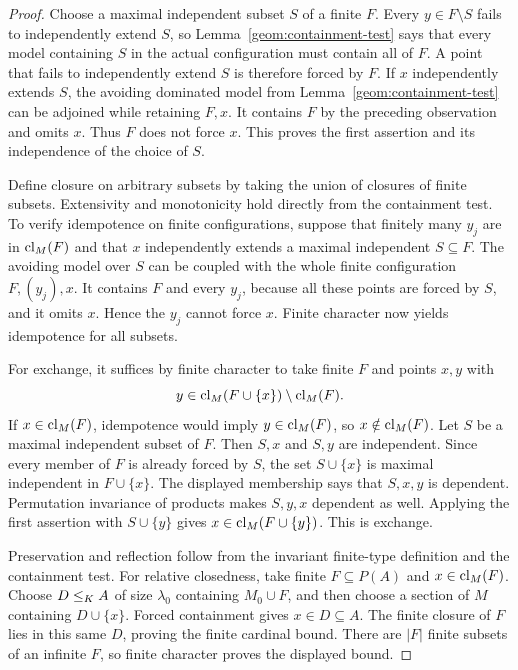 \begin{proof}
Choose a maximal independent subset $S$ of a finite $F$.  Every
$y\in F\setminus S$ fails to independently extend $S$, so
Lemma~\ref{geom:containment-test} says that every model containing $S$
in the actual configuration must contain all of $F$.  A point that
fails to independently extend $S$ is therefore forced by $F$.
If $x$ independently extends $S$, the avoiding dominated model from
Lemma~\ref{geom:containment-test} can be adjoined while retaining
$F,x$.  It contains $F$ by the preceding observation and omits $x$.
Thus $F$ does not force $x$.  This proves the first assertion and its
independence of the choice of $S$.

Define closure on arbitrary subsets by taking the union of closures
of finite subsets.  Extensivity and monotonicity hold directly from
the containment test.  To verify idempotence on finite configurations,
suppose that finitely many $y_j$ are in $\operatorname{cl}_M(F)$ and that $x$
independently extends a maximal independent $S\subseteq F$.  The
avoiding model over $S$ can be coupled with the whole finite
configuration $F,(y_j),x$.  It contains $F$ and every $y_j$, because
all these points are forced by $S$, and it omits $x$.  Hence the
$y_j$ cannot force $x$.  Finite character now yields idempotence for
all subsets.

For exchange, it suffices by finite character to take finite $F$ and
points $x,y$ with
\[
y\in\operatorname{cl}_M(F\cup\{x\})\setminus\operatorname{cl}_M(F).
\]
If $x\in\operatorname{cl}_M(F)$, idempotence would imply $y\in\operatorname{cl}_M(F)$, so
$x\notin\operatorname{cl}_M(F)$.  Let $S$ be a maximal independent subset of $F$.
Then $S,x$ and $S,y$ are independent.  Since every member of $F$ is
already forced by $S$, the set $S\cup\{x\}$ is maximal independent
in $F\cup\{x\}$.  The displayed membership says that $S,x,y$ is
dependent.  Permutation invariance of products makes $S,y,x$
dependent as well.  Applying the first assertion with $S\cup\{y\}$
gives $x\in\operatorname{cl}_M(F\cup\{y\})$.  This is exchange.

Preservation and reflection follow from the invariant finite-type
definition and the containment test.  For relative closedness, take
finite $F\subseteq P(A)$ and $x\in\operatorname{cl}_M(F)$.  Choose
$D\leq_K A$ of size $\lambda_0$ containing $M_0\cup F$, and then
choose a section of $M$ containing $D\cup\{x\}$.  Forced containment
gives $x\in D\subseteq A$.  The finite closure of $F$ lies in this
same $D$, proving the finite cardinal bound.  There are $|F|$ finite
subsets of an infinite $F$, so finite character proves the displayed
bound.


\end{proof}
